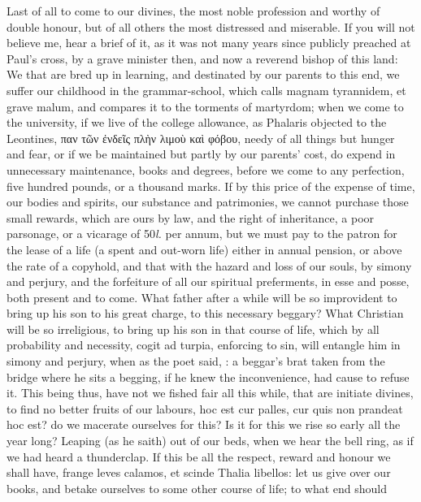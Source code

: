 {Last of all to come to our divines, the most noble profession and
worthy of double honour, but of all others the most distressed and
miserable. If you will not believe me, hear a brief of it, as it was
not many years since publicly preached at Paul's cross, by a
grave minister then, and now a reverend bishop of this land: We that
are bred up in learning, and destinated by our parents to this end, we
suffer our childhood in the grammar-school, which \Austin{} calls magnam
tyrannidem, et grave malum, and compares it to the torments of
martyrdom; when we come to the university, if we live of the college
allowance, as Phalaris objected to the Leontines, \textgreek{παν τῶν ἐνδεῖς πλὴν
λιμοὺ καὶ φόβου}, needy of all things but hunger and fear, or if we be
maintained but partly by our parents' cost, do expend in unnecessary
maintenance, books and degrees, before we come to any perfection, five
hundred pounds, or a thousand marks. If by this price of the expense of
time, our bodies and spirits, our substance and patrimonies, we cannot
purchase those small rewards, which are ours by law, and the right of
inheritance, a poor parsonage, or a vicarage of 50\emph{l.} per annum, but
we must pay to the patron for the lease of a life (a spent and out-worn
life) either in annual pension, or above the rate of a copyhold, and
that with the hazard and loss of our souls, by simony and perjury, and
the forfeiture of all our spiritual preferments, in esse and posse,
both present and to come. What father after a while will be so
improvident to bring up his son to his great charge, to this necessary
beggary? What Christian will be so irreligious, to bring up his son in
that course of life, which by all probability and necessity, cogit ad
turpia, enforcing to sin, will entangle him in simony and perjury, when
as the poet said, : a
beggar's brat taken from the bridge where he sits a begging, if he knew
the inconvenience, had cause to refuse it. This being thus, have not we
fished fair all this while, that are initiate divines, to find no
better fruits of our labours,  hoc est cur palles, cur quis non
prandeat hoc est? do we macerate ourselves for this? Is it for this we
rise so early all the year long? Leaping (as he saith) out of our
beds, when we hear the bell ring, as if we had heard a thunderclap. If
this be all the respect, reward and honour we shall have, frange
leves calamos, et scinde Thalia libellos: let us give over our books,
and betake ourselves to some other course of life; to what end should
}
